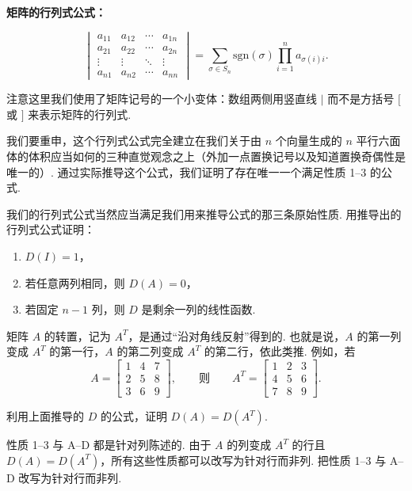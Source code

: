\begin{center}
\textbf{矩阵的行列式公式：}
\end{center}
\[
\begin{vmatrix}a_{11}&a_{12}&\cdots&a_{1n}\\a_{21}&a_{22}&\cdots&a_{2n}\\\vdots&\vdots&\ddots&\vdots\\a_{n1}&a_{n2}&\cdots&a_{nn}\end{vmatrix}
=\sum_{\sigma\in S_n}\mathrm{sgn}(\sigma)\prod_{i=1}^{n}a_{\sigma(i)i}.
\]

注意这里我们使用了矩阵记号的一个小变体：数组两侧用竖直线 $|$ 而不是方括号 $[$ 或 $]$ 来表示矩阵的行列式.

我们要重申，这个行列式公式完全建立在我们关于由 $n$ 个向量生成的 $n$ 平行六面体的体积应当如何的三种直觉观念之上（外加一点置换记号以及知道置换奇偶性是唯一的）. 通过实际推导这个公式，我们证明了存在唯一一个满足性质 1--3 的公式.

\begin{question}\label{q:1-15}
我们的行列式公式当然应当满足我们用来推导公式的那三条原始性质. 用推导出的行列式公式证明：
\begin{enumerate}
  \item[(a)] $D(I)=1$，
  \item[(b)] 若任意两列相同，则 $D(A)=0$，
  \item[(c)] 若固定 $n-1$ 列，则 $D$ 是剩余一列的线性函数.
\end{enumerate}
\end{question}

矩阵 $A$ 的转置，记为 $A^T$，是通过``沿对角线反射''得到的. 也就是说，$A$ 的第一列变成 $A^T$ 的第一行，$A$ 的第二列变成 $A^T$ 的第二行，依此类推. 例如，若
\[
A=\begin{bmatrix}1&4&7\\2&5&8\\3&6&9\end{bmatrix},\qquad\text{则}\qquad
A^T=\begin{bmatrix}1&2&3\\4&5&6\\7&8&9\end{bmatrix}.
\]

\begin{question}\label{q:1-16}
利用上面推导的 $D$ 的公式，证明 $D(A)=D(A^T)$.
\end{question}

\begin{question}\label{q:1-17}
性质 1--3 与 A--D 都是针对列陈述的. 由于 $A$ 的列变成 $A^T$ 的行且 $D(A)=D(A^T)$，所有这些性质都可以改写为针对行而非列. 把性质 1--3 与 A--D 改写为针对行而非列.
\end{question}

